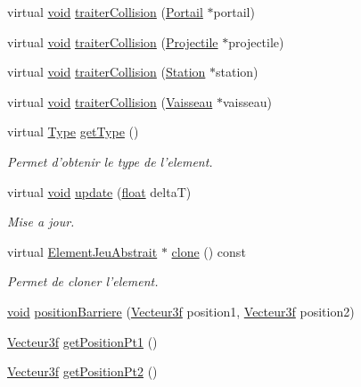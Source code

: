 \begin{DoxyCompactItemize}
\item 
virtual \hyperlink{wglew_8h_aeea6e3dfae3acf232096f57d2d57f084}{void} \hyperlink{class_barriere_a253f995214d58262ef072d47f705573b}{traiter\-Collision} (\hyperlink{class_portail}{Portail} $\ast$portail)
\item 
virtual \hyperlink{wglew_8h_aeea6e3dfae3acf232096f57d2d57f084}{void} \hyperlink{group__inf2990_gaa09a3ee20ab537a1c4f37ad3edcb55b6}{traiter\-Collision} (\hyperlink{class_projectile}{Projectile} $\ast$projectile)
\item 
virtual \hyperlink{wglew_8h_aeea6e3dfae3acf232096f57d2d57f084}{void} \hyperlink{class_barriere_a321838647c5e214b6c0f7374b23f7dfa}{traiter\-Collision} (\hyperlink{class_station}{Station} $\ast$station)
\item 
virtual \hyperlink{wglew_8h_aeea6e3dfae3acf232096f57d2d57f084}{void} \hyperlink{group__inf2990_ga09b425373e5f02b1cbe200e71e006cfd}{traiter\-Collision} (\hyperlink{class_vaisseau}{Vaisseau} $\ast$vaisseau)
\item 
virtual \hyperlink{group___i_n_f2990-04_ga1d1cfd8ffb84e947f82999c682b666a7}{Type} \hyperlink{group__inf2990_ga9a0160da5089efa38867ad45782ae40d}{get\-Type} ()
\begin{DoxyCompactList}\small\item\em Permet d'obtenir le type de l'element. \end{DoxyCompactList}\item 
virtual \hyperlink{wglew_8h_aeea6e3dfae3acf232096f57d2d57f084}{void} \hyperlink{group__inf2990_ga171ffac6e81bf3bbd884212945946354}{update} (\hyperlink{fmod_8h_aeb841aa4b4b5f444b5d739d865b420af}{float} delta\-T)
\begin{DoxyCompactList}\small\item\em Mise a jour. \end{DoxyCompactList}\item 
virtual \hyperlink{class_element_jeu_abstrait}{Element\-Jeu\-Abstrait} $\ast$ \hyperlink{group__inf2990_gad0aa2475444721471fc452d1b6f9438e}{clone} () const 
\begin{DoxyCompactList}\small\item\em Permet de cloner l'element. \end{DoxyCompactList}\item 
\hyperlink{wglew_8h_aeea6e3dfae3acf232096f57d2d57f084}{void} \hyperlink{group__inf2990_ga00c08e4b911e95aa83ddcd087ff09294}{position\-Barriere} (\hyperlink{group__utilitaire_ga6b2956069f76c7e27df4f79f87e5a48c}{Vecteur3f} position1, \hyperlink{group__utilitaire_ga6b2956069f76c7e27df4f79f87e5a48c}{Vecteur3f} position2)
\item 
\hyperlink{group__utilitaire_ga6b2956069f76c7e27df4f79f87e5a48c}{Vecteur3f} \hyperlink{group__inf2990_ga9993ac42c28c45c33526233cfcc302e0}{get\-Position\-Pt1} ()
\item 
\hyperlink{group__utilitaire_ga6b2956069f76c7e27df4f79f87e5a48c}{Vecteur3f} \hyperlink{group__inf2990_ga45d889538f981bc7d4ebdb631b570ffe}{get\-Position\-Pt2} ()
\end{DoxyCompactItemize}
